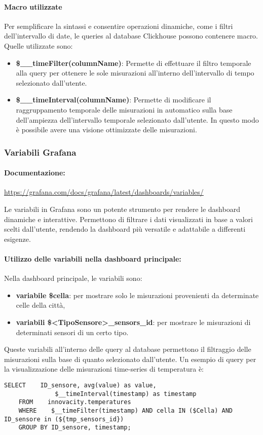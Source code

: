 \paragraph{Macro utilizzate}\label{sec:macros}
Per semplificare la sintassi e consentire operazioni dinamiche, come i filtri dell'intervallo di date, le queries al database Clickhouse possono contenere macro.
Quelle utilizzate sono:
\begin{itemize}
    \item \textbf{\$\_\_timeFilter(columnName)}: Permette di effettuare il filtro temporale alla query per ottenere le sole misurazioni all'interno dell'intervallo di tempo selezionato dall'utente.
    \item  \textbf{\$\_\_timeInterval(columnName)}: Permette di modificare il raggruppamento temporale delle misurazioni in automatico sulla base dell'ampiezza dell'intervallo temporale selezionato dall'utente.
    In questo modo è possibile avere una visione ottimizzate delle misurazioni.
\end{itemize}

\subsubsection{Variabili Grafana}
\paragraph*{Documentazione:} \href{https://grafana.com/docs/grafana/latest/dashboards/variables/}{https://grafana.com/docs/grafana/latest/dashboards/variables/}


 Le variabili in Grafana sono un potente strumento per rendere le dashboard dinamiche e interattive. Permettono di filtrare i dati visualizzati in base a valori scelti dall'utente, rendendo la dashboard più versatile e adattabile a differenti esigenze.
\paragraph*{Utilizzo delle variabili nella dashboard principale:}
Nella dashboard principale, le variabili sono:
\begin{itemize}
    \item \textbf{variabile \$cella}: per mostrare solo le misurazioni provenienti da determinate celle della città, 
    \item \textbf{variabili \$<TipoSensore>\_sensors\_id}: per mostrare le misurazioni di determinati sensori di un certo tipo.
\end{itemize}
Queste variabili all'interno delle query al database permettono il filtraggio delle misurazioni sulla base di quanto selezionato dall'utente.
Un esempio di query per la visualizzazione delle misurazioni time-series di temperatura è:
\begin{lstlisting}[style=code]
    SELECT    ID_sensore, avg(value) as value,
              $__timeInterval(timestamp) as timestamp
    FROM    innovacity.temperatures 
    WHERE    $__timeFilter(timestamp) AND cella IN ($Cella) AND ID_sensore in (${tmp_sensors_id})
    GROUP BY ID_sensore, timestamp;
\end{lstlisting}

